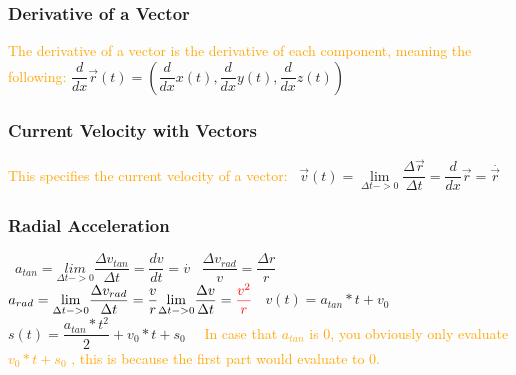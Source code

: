 \documentclass[main.tex,fontsize=8pt,paper=a4,paper=portrait,DIV=calc,]{scrartcl}
\begin{document}
\begin{multicols*}{2}
\subsubsection{Derivative of a Vector}
\textcolor{orange}{The derivative of a vector is the derivative of each component, meaning the following:}\newline
\large \(\dfrac{d}{dx} \vec{r}(t) = (\dfrac{d}{dx} x(t), \dfrac{d}{dx} y(t), \dfrac{d}{dx} z(t) ) \)\newline
\, \newline \normalsize

\subsubsection{Current Velocity with Vectors}
\textcolor{orange}{This specifies the current velocity of a vector:}\newline
\, \newline
\large \( \vec{v}(t) = \underset{\Delta t -> 0}{\lim} \dfrac{\Delta \vec{r}}{\Delta t} = \dfrac{d}{dx} \vec{r} = \overset{.}{\vec{r}} \) \newline 
\, \newline \normalsize

\subsubsection{Radial Acceleration}
\, \newline
\large \( a_{tan} = \underset{\Delta t -> 0}{lim} \dfrac{\Delta v_{tan}}{\Delta t} = \dfrac{dv}{dt} = \overset{.}{v} \) \newline
\, \newline
\large \( \dfrac{\Delta v_{rad}}{v} = \dfrac{\Delta r}{r}\)
\, \newline
\large \( a_{rad} = \underset{\Delta t -> 0}{\lim} \dfrac{\Delta v_{rad}}{\Delta t} = \dfrac{v}{r}\underset{\Delta t -> 0}{\lim} \dfrac{\Delta v}{\Delta t} = \textcolor{red}{\dfrac{v^2}{r}} \) \newline
\, \newline
\large \( v(t) = a_{tan} * t + v_0 \) \newline
\large \( s(t) = \dfrac{a_{tan} * t^2}{2} + v_0 * t + s_0\) \newline
\, \newline \normalsize \
\textcolor{orange}{In case that \(a_{tan}\) is 0, you obviously only evaluate \(v_0 * t + s_0\) , this is because the first part would evaluate to 0.}


\end{multicols*}
\end{document}
